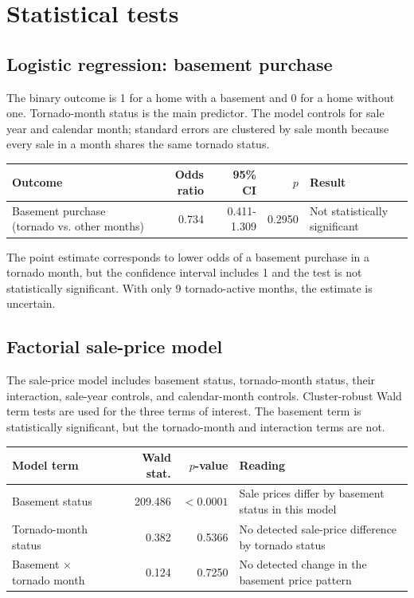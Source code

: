 ﻿\documentclass[11pt]{article}
\begin{document}
\section*{Statistical tests}
\subsection*{Logistic regression: basement purchase}
The binary outcome is 1 for a home with a basement and 0 for a home without one. Tornado-month status is the main predictor. The model controls for sale year and calendar month; standard errors are clustered by sale month because every sale in a month shares the same tornado status.

\begin{table}[H]
\centering
\small
\begin{tabularx}{\textwidth}{lrrrX}
\toprule
Outcome & Odds ratio & 95\% CI & $p$ & Result \\
\midrule
Basement purchase (tornado vs. other months) & 0.734 & 0.411-1.309 & 0.2950 & Not statistically significant \\
\bottomrule
\end{tabularx}
\end{table}
The point estimate corresponds to lower odds of a basement purchase in a tornado month, but the confidence interval includes 1 and the test is not statistically significant. With only 9 tornado-active months, the estimate is uncertain.

\subsection*{Factorial sale-price model}
The sale-price model includes basement status, tornado-month status, their interaction, sale-year controls, and calendar-month controls. Cluster-robust Wald term tests are used for the three terms of interest. The basement term is statistically significant, but the tornado-month and interaction terms are not.

\begin{table}[H]
\centering
\small
\begin{tabularx}{\textwidth}{lrrX}
\toprule
Model term & Wald stat. & $p$-value & Reading \\
\midrule
Basement status & 209.486 & $<0.0001$ & Sale prices differ by basement status in this model \\
Tornado-month status & 0.382 & 0.5366 & No detected sale-price difference by tornado status \\
Basement $\times$ tornado month & 0.124 & 0.7250 & No detected change in the basement price pattern \\
\bottomrule
\end{tabularx}
\end{table}
\end{document}
